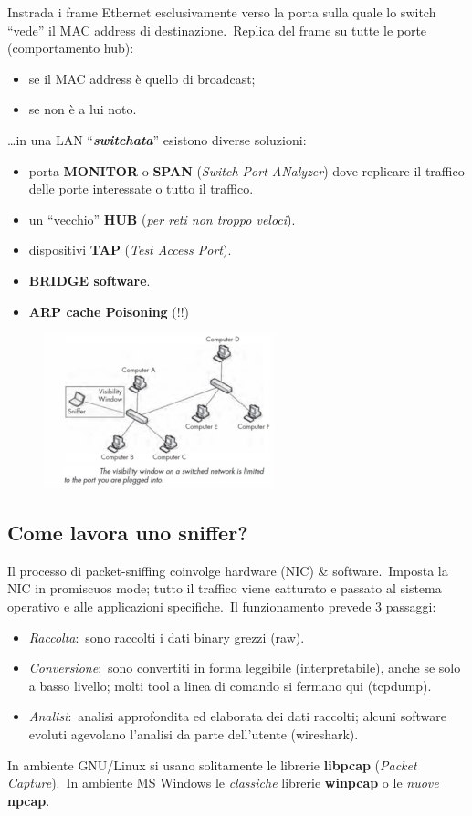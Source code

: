 Instrada i frame Ethernet esclusivamente verso la porta sulla quale lo switch ``vede'' il MAC address di destinazione.\
Replica del frame su tutte le porte (comportamento hub):
\begin{itemize}
    \item se il MAC address è quello di broadcast;
    \item se non è a lui noto.
\end{itemize}
\dots in una LAN ``\textbf{\emph{switchata}}'' esistono diverse soluzioni:
\begin{itemize}
    \item porta \textbf{MONITOR} o \textbf{SPAN} (\emph{Switch Port ANalyzer}) dove replicare il traffico delle porte interessate o tutto il traffico.
    \item un ``vecchio'' \textbf{HUB} (\emph{per reti non troppo veloci}).
    \item dispositivi \textbf{TAP} (\emph{Test Access Port}).
    \item \textbf{BRIDGE software}.
    \item \textbf{ARP cache Poisoning} (!!)
\end{itemize}
\begin{figure}[H]
    \centering
    \includegraphics[width=0.6\textwidth]{immagini/sniffer_switch.png}
\end{figure}

\subsection{Come lavora uno sniffer?}

Il processo di packet-sniffing coinvolge hardware (NIC) \& software.\
Imposta la NIC in promiscuos mode; tutto il traffico viene catturato e passato al sistema operativo e alle applicazioni specifiche.\
Il funzionamento prevede 3 passaggi:
\begin{itemize}
    \item \emph{Raccolta}:\ sono raccolti i dati binary grezzi (raw).
    \item \emph{Conversione}:\ sono convertiti in forma leggibile (interpretabile), anche se solo a basso livello; molti tool a linea di comando si fermano qui (tcpdump).
    \item \emph{Analisi}:\ analisi approfondita ed elaborata dei dati raccolti; alcuni software evoluti agevolano l’analisi da parte dell’utente (wireshark).
\end{itemize}
In ambiente GNU/Linux si usano solitamente le librerie \textbf{libpcap} (\emph{Packet Capture}).\
In ambiente MS Windows le \emph{classiche} librerie \textbf{winpcap} o le \emph{nuove} \textbf{npcap}.

